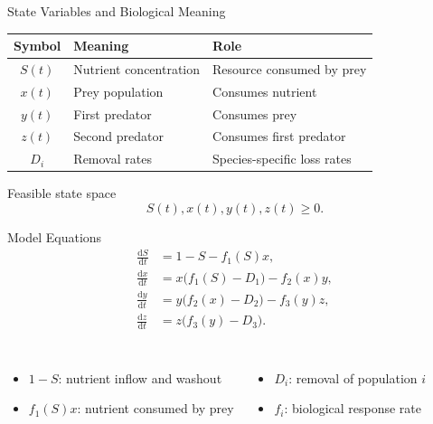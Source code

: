 \documentclass[aspectratio=169,10pt]{beamer}
\newcommand{\dd}{\mathrm{d}}
\begin{document}
\begin{frame}{State Variables and Biological Meaning}
\centering
\renewcommand{\arraystretch}{1.25}
\begin{tabular}{c p{} p{}}
\toprule
Symbol & Meaning & Role \\
\midrule
$S(t)$ & Nutrient concentration & Resource consumed by prey \\
$x(t)$ & Prey population & Consumes nutrient \\
$y(t)$ & First predator & Consumes prey \\
$z(t)$ & Second predator & Consumes first predator \\
$D_i$ & Removal rates & Species-specific loss rates \\
\bottomrule
\end{tabular}
\vspace{1em}
\begin{block}{Feasible state space}
\[
S(t),x(t),y(t),z(t) \ge 0.
\]
\end{block}
\end{frame}

\begin{frame}{Model Equations}
\begin{align*}
\frac{\dd S}{\dd t} &= 1-S-f_1(S)x,\\
\frac{\dd x}{\dd t} &= x\bigl(f_1(S)-D_1\bigr)-f_2(x)y,\\
\frac{\dd y}{\dd t} &= y\bigl(f_2(x)-D_2\bigr)-f_3(y)z,\\
\frac{\dd z}{\dd t} &= z\bigl(f_3(y)-D_3\bigr).
\end{align*}
\vspace{-0.2em}
\begin{columns}[T,onlytextwidth]
\begin{itemize}
  \item $1-S$: nutrient inflow and washout
  \item $f_1(S)x$: nutrient consumed by prey
\end{itemize}
\begin{itemize}
  \item $D_i$: removal of population $i$
  \item $f_i$: biological response rate
\end{itemize}
\end{columns}
\end{frame}
\end{document}
